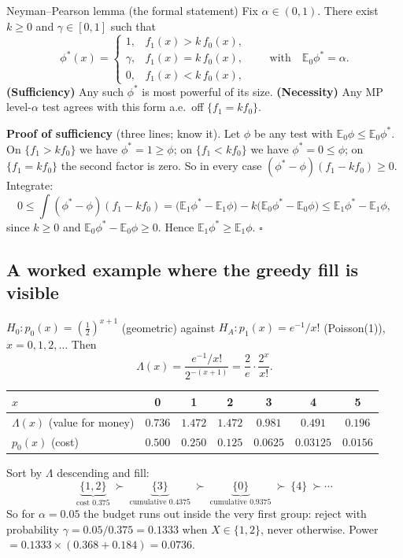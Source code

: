 \documentclass[11pt]{article}
\newcommand{\E}{\mathbb{E}}
\begin{document}
\begin{idea}{Neyman--Pearson lemma (the formal statement)}
Fix $\alpha\in(0,1)$. There exist $k\ge0$ and $\gamma\in[0,1]$ such that
\[
\phi^*(x)=\begin{cases}
1, & f_1(x)>k\,f_0(x),\\
\gamma, & f_1(x)=k\,f_0(x),\\
0, & f_1(x)<k\,f_0(x),
\end{cases}
\qquad\text{with}\quad \E_0\phi^*=\alpha .
\]
\textbf{(Sufficiency)} Any such $\phi^*$ is most powerful of its size.
\textbf{(Necessity)} Any MP level-$\alpha$ test agrees with this form a.e.\ off $\{f_1=kf_0\}$.
\end{idea}

\textbf{Proof of sufficiency} (three lines; know it). Let $\phi$ be any test with
$\E_0\phi\le\E_0\phi^*$. On $\{f_1>kf_0\}$ we have $\phi^*=1\ge\phi$; on $\{f_1<kf_0\}$ we have
$\phi^*=0\le\phi$; on $\{f_1=kf_0\}$ the second factor is zero. So in every case
$(\phi^*-\phi)(f_1-kf_0)\ge0$. Integrate:
\[
0\le\int(\phi^*-\phi)(f_1-kf_0)=\big(\E_1\phi^*-\E_1\phi\big)-k\big(\E_0\phi^*-\E_0\phi\big)
\le\E_1\phi^*-\E_1\phi ,
\]
since $k\ge0$ and $\E_0\phi^*-\E_0\phi\ge0$. Hence $\E_1\phi^*\ge\E_1\phi$. $\square$

\subsection{A worked example where the greedy fill is visible}

$H_0: p_0(x)=(\tfrac12)^{x+1}$ (geometric) against $H_A: p_1(x)=e^{-1}/x!$ (Poisson(1)),
$x=0,1,2,\dots$ Then
\[
\Lambda(x)=\frac{e^{-1}/x!}{2^{-(x+1)}}=\frac2e\cdot\frac{2^{x}}{x!} .
\]
\begin{center}
\renewcommand{\arraystretch}{1.3}
\begin{tabular}{@{}lcccccc@{}}
\toprule
$x$ & 0 & 1 & 2 & 3 & 4 & 5 \\
\midrule
$\Lambda(x)$ (value for money) & $0.736$ & $\mathbf{1.472}$ & $\mathbf{1.472}$ & $0.981$ & $0.491$ & $0.196$ \\
$p_0(x)$ (cost) & $0.500$ & $0.250$ & $0.125$ & $0.0625$ & $0.03125$ & $0.0156$ \\
\bottomrule
\end{tabular}
\end{center}
Sort by $\Lambda$ descending and fill:
\[
\underbrace{\{1,2\}}_{\text{cost }0.375}\ \succ\
\underbrace{\{3\}}_{\text{cumulative }0.4375}\ \succ\
\underbrace{\{0\}}_{\text{cumulative }0.9375}\ \succ\ \{4\}\ \succ\cdots
\]
So for $\alpha=0.05$ the budget runs out inside the very first group: reject with probability
$\gamma=0.05/0.375=0.1333$ when $X\in\{1,2\}$, never otherwise. Power
$=0.1333\times(0.368+0.184)=0.0736$.
\end{document}
